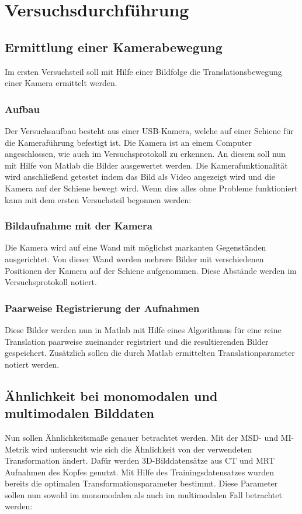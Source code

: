 \section{Versuchsdurchführung}
\subsection{Ermittlung einer Kamerabewegung}
Im ersten Versuchsteil soll mit Hilfe einer Bildfolge die Translationsbewegung
einer Kamera ermittelt werden. 
\subsubsection{Aufbau}
Der Versuchsaufbau besteht aus einer USB-Kamera, welche auf einer Schiene für
die Kameraführung befestigt ist. Die Kamera ist an einem Computer
angeschlossen, wie auch im Versuchsprotokoll zu erkennen. An diesem soll nun
mit Hilfe von Matlab die Bilder ausgewertet werden. Die Kamerafunktionalität
wird anschließend getestet indem das Bild als Video angezeigt wird und die
Kamera auf der Schiene bewegt wird. Wenn dies alles ohne Probleme funktioniert
kann mit dem ersten Versuchsteil begonnen werden:

\subsubsection{Bildaufnahme mit der Kamera}
Die Kamera wird auf eine Wand mit möglichst markanten Gegenständen
ausgerichtet. Von dieser Wand werden mehrere Bilder mit verschiedenen
Positionen der Kamera auf der Schiene aufgenommen. Diese Abstände werden im
Versuchsprotokoll notiert.

\subsubsection{Paarweise Registrierung der Aufnahmen}
Diese Bilder werden nun in Matlab mit Hilfe eines Algorithmus für eine reine
Translation paarweise zueinander registriert und die resultierenden Bilder
gespeichert. Zusätzlich sollen die durch Matlab ermittelten
Translationparameter notiert werden.

\subsection{Ähnlichkeit bei monomodalen und multimodalen Bilddaten}
Nun sollen Ähnlichkeitsmaße genauer betrachtet werden. Mit der MSD- und
MI-Metrik wird untersucht wie sich die Ähnlichkeit von der verwendeten
Transformation ändert. Dafür werden 3D-Bilddatensätze aus CT und MRT Aufnahmen
des Kopfes genutzt. Mit Hilfe des Trainingsdatensatzes wurden bereits die
optimalen Transformationsparameter bestimmt. Diese Parameter sollen nun sowohl
im monomodalen als auch im multimodalen Fall betrachtet werden:

